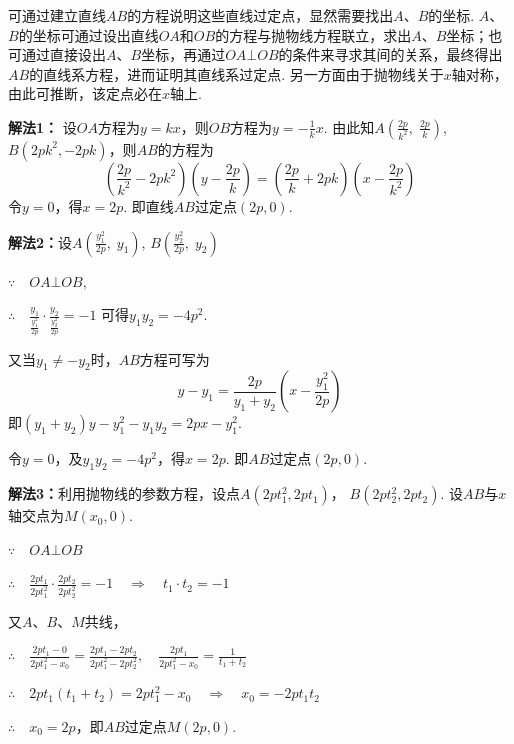 \noindent
\begin{minipage}{.57\textwidth}
\begin{analyze}
可通过建立直线$AB$的方程说明这些直线过定点，显然需要找出$A$、$B$的坐标. $A$、$B$的坐标可通过设出直线$OA$和$OB$的方程与抛物线方程联立，求出$A$、$B$坐标；也可通过直接设出$A$、$B$坐标，再通过$OA\bot OB$的条件来寻求其间的关系，最终得出$AB$的直线系方程，进而证明其直线系过定点. 另一方面由于抛物线关于$x$轴对称，由此可推断，该定点必在$x$轴上.
\end{analyze}
\end{minipage}\hfill
\begin{minipage}{.4\textwidth}
    \centering
{}    
\end{minipage}

\begin{solution}
\textbf{解法1：} 设$OA$方程为$y=kx$，则$OB$方程为$y=-\frac{1}{k}x$. 由此知$A\left(\frac{2p}{k^2},\; \frac{2p}{k}\right)$, $B(2pk^2,-2pk)$，则$AB$的方程为
\[\left(\frac{2p}{k^2}-2pk^2\right)\left(y-\frac{2p}{k}\right)=\left(\frac{2p}{k}+2pk\right)\left(x-\frac{2p}{k^2}\right)\]
令$y=0$，得$x=2p$. 即直线$AB$过定点$(2p,0)$.

\textbf{解法2：}设$A\left(\frac{y^2_1}{2p},\; y_1\right)$, $B\left(\frac{y^2_2}{2p},\; y_2\right)$

$\because\quad OA\bot OB$,

$\therefore\quad \frac{y_1}{\frac{y^2_1}{2p}}\cdot \frac{y_2}{\frac{y^2_2}{2p}}=-1$
可得$y_1y_2=-4p^2$.

又当$y_1\ne -y_2$时，$AB$方程可写为
\[y-y_1=\frac{2p}{y_1+y_2}\left(x-\frac{y^2_1}{2p}\right)\]
即$(y_1+y_2)y-y_1^2-y_1y_2=2px-y_1^2$.

令$y=0$，及$y_1y_2=-4p^2$，得$x=2p$. 即$AB$过定点$(2p,0)$.

\textbf{解法3：}利用抛物线的参数方程，设点$A(2pt_1^2,2pt_1)$，
$B(2pt_2^2, 2pt_2)$. 设$AB$与$x$轴交点为$M(x_0,0)$.

$\because \quad OA\bot OB$

$\therefore\quad \frac{2pt_1}{2pt_1^2}\cdot \frac{2pt_2}{2pt_2^2}=-1\quad \Rightarrow\quad  t_1\cdot t_2=-1$

又$A$、$B$、$M$共线，

$\therefore\quad \frac{2pt_1-0}{2pt^2_1-x_0}=\frac{2pt_1-2pt_2}{2pt_1^2-2pt_2^2},\quad \frac{2pt_1}{2pt_1^2-x_0}=\frac{1}{t_1+t_2}$

$\therefore\quad 2pt_1(t_1+t_2)=2pt^2_1-x_0 \quad \Rightarrow \quad x_0=-2pt_1t_2$

$\therefore\quad x_0=2p$，即$AB$过定点$M(2p,0)$.
\end{solution}



